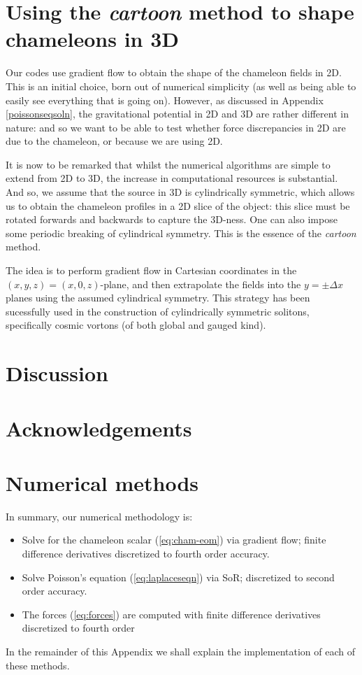 \documentclass[a4paper, 12pt]{article}
\numberwithin{equation}{section}
\begin{document}
\section{Using the \textit{cartoon} method to shape chameleons in 3D}
Our codes use gradient flow to obtain the shape of the chameleon fields in 2D. This is an initial choice, born out of numerical simplicity (as well as being able to easily see everything that is going on). However, as discussed in Appendix \ref{poissonseqsoln}, the gravitational potential in 2D and 3D are rather different in nature: and so we want to be able to test whether force discrepancies in 2D are due to the chameleon, or because we are using 2D. 

It is now to be remarked that whilst the numerical algorithms are simple to extend from 2D to 3D, the increase in computational resources is substantial. And so, we assume that the source in 3D is cylindrically symmetric, which allows us to obtain the chameleon profiles in a 2D slice of the object: this slice must be rotated forwards and backwards to capture the 3D-ness. One can also impose some periodic breaking of cylindrical symmetry. This is the essence of the \textit{cartoon} method. 

The idea is to perform gradient flow in Cartesian coordinates in the $(x,y,z) = (x,0,z)$-plane, and then extrapolate the fields into the $y = \pm \Delta x$ planes using the assumed cylindrical symmetry. This strategy has been sucessfully used in the construction of cylindrically symmetric solitons, specifically cosmic vortons (of both global and gauged kind).

\section{Discussion}


\section*{Acknowledgements}

\appendix
\section{Numerical methods}
\label{sec:nummethods}
In summary, our numerical methodology is:
\begin{itemize}
\item Solve for the chameleon scalar (\ref{eq:cham-eom}) via gradient flow; finite difference derivatives discretized to fourth order accuracy.
\item Solve Poisson's equation (\ref{eq:laplaceseqn}) via SoR; discretized to second order accuracy.
\item The forces (\ref{eq:forces}) are computed with finite difference derivatives discretized to fourth order
\end{itemize}
In the remainder of this Appendix we shall explain the implementation of each of these methods.
\end{document}
